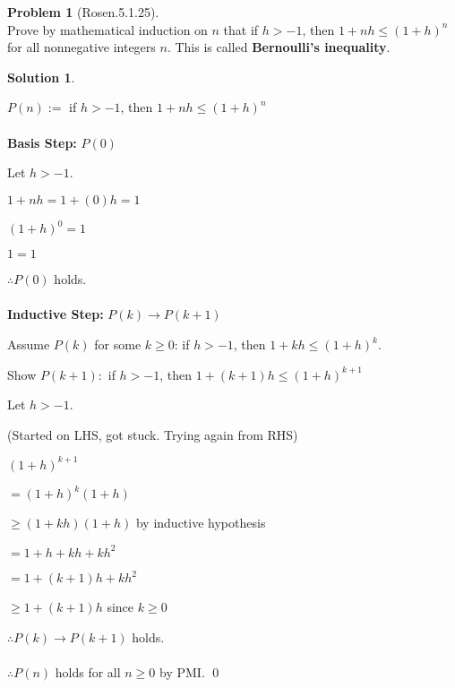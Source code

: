 \documentclass{article}
\theoremstyle{definition}
\newtheorem*{problem}{Problem}
\newtheorem*{solution}{Solution}
\begin{document}
\begin{problem}[Rosen.5.1.25]\ \\
Prove by mathematical induction on $n$ that if $h > -1$, then $1+nh \leq (1+h)^n$ for all nonnegative integers $n$.  This is called \textbf{Bernoulli's inequality}.
\end{problem}

\begin{solution}\ \\
{\color{red}
$P(n) := $ if $h > -1$, then $1+nh \leq (1+h)^n$\\
\\
\textbf{Basis Step:} $P(0)$

Let $h > -1$.

$1 + nh = 1 + (0)h = 1$

$(1+h)^0 = 1$

$1=1$ \checkmark

$\therefore P(0)$ holds.\\
\\
\textbf{Inductive Step:} $P(k) \to P(k+1)$

Assume $P(k)$ for some $k \geq 0$: if $h > -1$, then $1+kh \leq (1+h)^k$.

Show $P(k+1):$ if $h > -1$, then $1+(k+1)h \leq (1+h)^{k+1}$

Let $h > -1$.

(Started on LHS, got stuck.  Trying again from RHS)

$(1+h)^{k+1}$

$= (1+h)^k(1+h)$

$\geq (1+kh)(1+h)$ by inductive hypothesis

$= 1 + h + kh + kh^2$

$= 1 + (k+1)h + kh^2$

$\geq 1 + (k+1)h$ since $k \geq 0$ \checkmark

$\therefore P(k) \to P(k+1)$ holds.\\
\\
$\therefore P(n)$ holds for all $n \geq 0$ by PMI. \qed
}
\end{solution}
\end{document}
